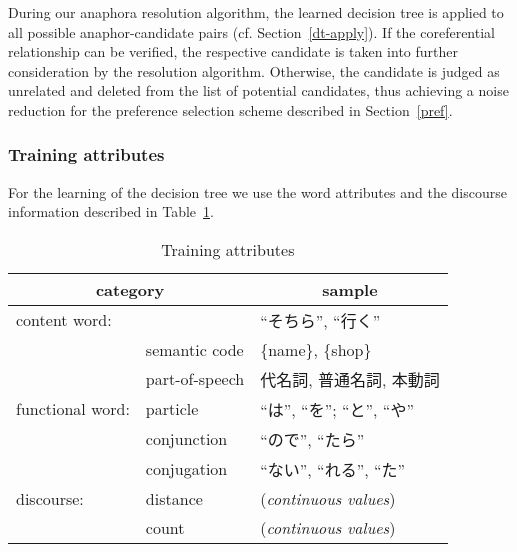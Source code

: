 During our anaphora resolution algorithm, the learned decision tree is applied to all
possible anaphor-candidate pairs  (cf. Section~\ref{dt-apply}).
If the coreferential relationship can be verified, the respective candidate is taken
into further consideration by the resolution algorithm. Otherwise, the candidate is
judged as unrelated and deleted from the list of potential candidates,
thus achieving a noise reduction for the preference selection scheme described
in Section~\ref{pref}.

\subsubsection{Training attributes}
\label{dt-attr}

For the learning of the decision tree we use the word attributes and the discourse
information described in Table~\ref{tab-dt-attr}.

\setlength{\tabcolsep}{5pt}
\begin{table}[hbt]
   \vspace*{-1\baselineskip}
   \begin{center}
    \caption{Training attributes}\label{tab-dt-attr} 
     \begin{tabular}{|ll|l|}
      \hline
      \multicolumn{2}{|c|}{category}        & \multicolumn{1}{c|}{sample}     \\
      \hline \hline
      \multicolumn{2}{|l|}{content word:}   & ``そちら'', ``行く''             \\
                                            & {\footnotesize semantic code}     & \{name\}, \{shop\}              \\
                                            & {\footnotesize part-of-speech}    & 代名詞, 普通名詞, 本動詞        \\
      \hline
      functional word: & {\footnotesize particle}    & ``は'', ``を''; ``と'', ``や''        \\ 
                       & {\footnotesize conjunction} & ``ので'', ``たら''                    \\
                       & {\footnotesize conjugation} & ``ない'', ``れる'', ``た''            \\
      \hline
      discourse:       & {\footnotesize distance}    & ({\em continuous values})       \\
                       & {\footnotesize count}       & ({\em continuous values})       \\
      \hline
     \end{tabular}
   \end{center}
   \vspace*{-1\baselineskip}
\end{table}

